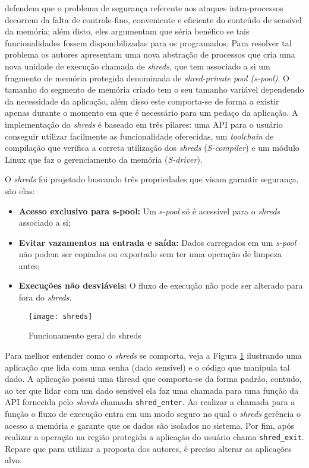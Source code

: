 \cite{shreds} defendem que o problema de segurança referente aos ataques
intra-processos decorrem da falta de controle-fino, conveniente e eficiente do
conteúdo de sensível da memória; além disto, eles argumentam que séria benéfico
se tais funcionalidades fossem disponibilizadas para os programados.  Para
resolver tal problema os autores apresentam uma nova abstração de processos que
cria uma nova unidade de execução chamada de \emph{shreds}, que tem associado a
si um fragmento de memória protegida denominada de \emph{shred-private pool
(s-pool)}. O tamanho do segmento de memória criado tem o seu tamanho variável
dependendo da necessidade da aplicação, além disso este comporta-se de forma a
existir apenas durante o momento em que é necessário para um pedaço da
aplicação. A implementação do \emph{shreds} é baseado em três pilares: uma API
para o usuário conseguir utilizar facilmente as funcionalidade oferecidas, um
\emph{toolchain} de compilação que verifica a correta utilização dos
\emph{shreds} (\emph{S-compiler}) e um módulo Linux que faz o gerenciamento da
memória (\emph{S-driver}).

O \emph{shreds} foi projetado buscando três propriedades que visam garantir
segurança, são elas:

\begin{itemize}
  \item \textbf{Acesso exclusivo para s-pool:} Um \emph{s-pool} só é acessível
        para o \emph{shreds} associado a si;
  \item \textbf{Evitar vazamentos na entrada e saída:} Dados carregados em um
        \emph{s-pool} não podem ser copiados ou exportado sem ter uma operação
        de limpeza antes;
  \item \textbf{Execuções não desviáveis:} O fluxo de execução não pode ser
        alterado para fora do \emph{shreds}.
\end{itemize}

\begin{figure}[!h]
  \centering
  \texttt{[image: shreds]} 
  \caption{Funcionamento geral do shreds}
  \label{fig:shreds}
\end{figure}


Para melhor entender como o \emph{shreds} se comporta, veja a Figura
\ref{fig:shreds} ilustrando uma aplicação que lida com uma senha (dado
sensível) e o código que manipula tal dado. A aplicação possui uma thread que
comporta-se da forma padrão, contudo, ao ter que lidar com um dado sensível ela
faz uma chamada para uma função da API fornecida pelo \emph{shreds} chamada
\texttt{shred\_enter}. Ao realizar a chamada para a função o fluxo de execução
entra em um modo seguro no qual o \emph{shreds} gerência o acesso a memória e
garante que os dados são isolados no sistema. Por fim, após realizar a operação
na região protegida a aplicação do usuário chama \texttt{shred\_exit}. Repare
que para utilizar a proposta dos autores, é preciso alterar as aplicações alvo.

